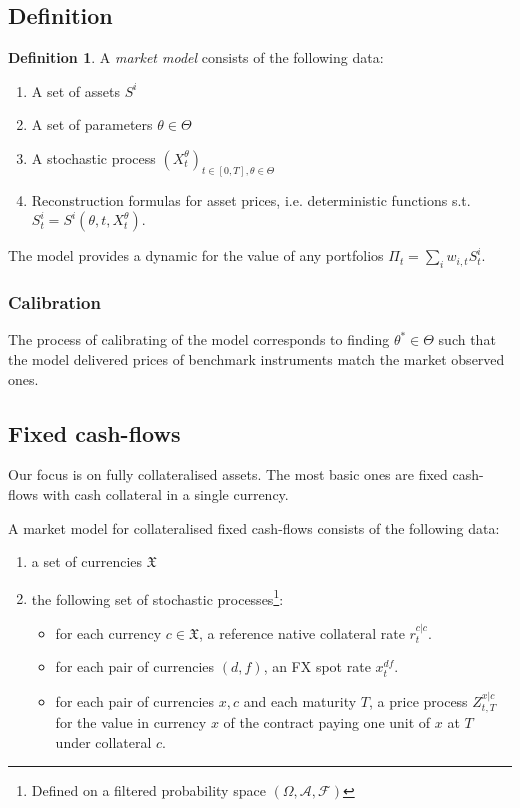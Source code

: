 \documentclass[11pt,english]{amsart}
\newcommand{\fr}{\mathfrak}
\theoremstyle{definition}
\newtheorem{defi}{Definition}
\begin{document}
\subsection{Definition}

\begin{defi}
A \emph{market model} consists of the following data:
\begin{enumerate}
\item A set of assets $S^i$ 
\item A set of parameters $\theta \in \Theta$
\item A stochastic process $(X^\theta_t)_{t\in [0,T],\theta \in \Theta}$ 
\item Reconstruction formulas for asset prices, i.e. deterministic functions s.t. $S^i_t = S^i(\theta,t,X^\theta_t)$. 
\end{enumerate}
\end{defi}

The model provides a dynamic for the value of any portfolios $\Pi_t = \sum_i w_{i,t} S^i_t$. 


\subsubsection*{Calibration}
The process of calibrating of the model corresponds to finding $\theta^* \in \Theta$ such that the model delivered prices of benchmark instruments match the market observed ones. 


\subsection{Fixed cash-flows}

Our focus is on fully collateralised assets. The most basic ones are fixed cash-flows with cash collateral in a single currency. 

A market model for collateralised fixed cash-flows consists of the following data:
\begin{enumerate}
\item a set of currencies $\fr{X}$ 
\item the following set of stochastic processes\footnote{Defined on a filtered probability space $(\Omega,\mathcal{A},\mathcal{F})$}:
\begin{itemize}
\item for each currency $c\in \fr{X}$, a reference native collateral rate $r^{c|c}_t$.
\item for each pair of currencies $(d,f)$, an FX spot rate $x^{df}_t$.
\item for each pair of currencies $x,c$ and each maturity $T$, a price process $Z^{x|c}_{t,T}$ for the value in currency $x$ of the contract paying one unit of $x$ at $T$ under collateral $c$.
\end{itemize}
\end{enumerate}
\end{document}
